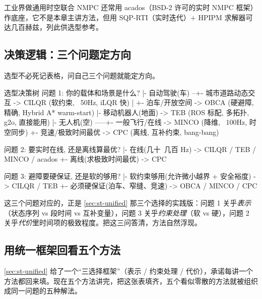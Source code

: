 \noindent 工业界做通用时空联合 NMPC 还常用 acados（BSD-2 许可的实时 NMPC 框架）作底座，它不是本章主讲方法，但用 SQP-RTI（实时迭代）+ HPIPM 求解器可达几百赫兹，列此供选型参考。

\subsection{决策逻辑：三个问题定方向}
\label{sec:st-select-logic}

选型不必死记表格，问自己三个问题就能定方向。

\begin{codebox}[text]{选型决策树}
问题 1: 你的载体和场景是什么?
  |- 自动驾驶(车) --+- 城市道路动态交互 -> CILQR (软约束, ~50Hz, iLQR 快)
  |                 +- 泊车/开放空间    -> OBCA  (硬避障, 精确, Hybrid A* warm-start)
  |- 移动机器人(地面) -> TEB (ROS 标配, 多拓扑, g2o, 直接能用)
  |- 无人机(空) -----+- 一般飞行/在线   -> MINCO (降维, ~100Hz, 时空同步)
                     +- 竞速/极致时间最优 -> CPC  (离线, 互补约束, bang-bang)

问题 2: 要实时在线, 还是离线算最优?
  |- 在线(几十~几百 Hz) -> CILQR / TEB / MINCO / acados
  +- 离线(求极致时间最优) -> CPC

问题 3: 避障要硬保证, 还是软的够用?
  |- 软约束够用(允许微小越界 + 安全裕度) -> CILQR / TEB
  +- 必须硬保证(泊车、窄缝、竞速)        -> OBCA / MINCO / CPC
\end{codebox}

\noindent 这三个问题对应的，正是 \cref{sec:st-unified} 那三个选择的实践版：问题 1 关乎\emph{表示}（状态序列 vs 段时间 vs 互补变量），问题 3 关乎\emph{约束处理}（软 vs 硬），问题 2 关乎\emph{代价}里时间项的极致程度。把这三问答清，方法自然浮现。

\subsection{用统一框架回看五个方法}
\label{sec:st-select-recap}

\cref{sec:st-unified} 给了一个“三选择框架”（表示 / 约束处理 / 代价），承诺每讲一个方法都回来填。现在五个方法讲完，把这张表填齐，五个看似零散的方法就被组织成同一问题的五种解法。

